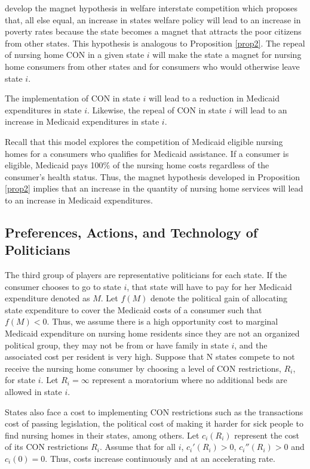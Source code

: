 \documentclass[../Main.tex]{subfiles}
\begin{document}
\citet{peterson1989american} develop the magnet hypothesis in welfare interstate competition which proposes that, all else equal, an increase in states welfare policy will lead to an increase in poverty rates because the state becomes a magnet that attracts the poor citizens from other states. This hypothesis is analogous to Proposition \ref{prop2}. The repeal of nursing home CON in a given state $i$ will make the state a magnet for nursing home consumers from other states and for consumers who would otherwise leave state $i$.

\begin{Proposition} \label{prop3}
The implementation of CON in state $i$ will lead to a reduction in Medicaid expenditures in state $i$. Likewise, the repeal of CON in state $i$ will lead to an increase in Medicaid expenditures in state $i$.  
\end{Proposition}

Recall that this model explores the competition of Medicaid eligible nursing homes for a consumers who qualifies for Medicaid assistance. If a consumer is eligible, Medicaid pays 100\% of the nursing home costs regardless of the consumer's health status. Thus, the magnet hypothesis developed in Proposition \ref{prop2} implies that an increase in the quantity of nursing home services will lead to an increase in Medicaid expenditures.

\subsection{Preferences, Actions, and Technology of Politicians}

The third group of players are representative politicians for each state. If the consumer chooses to go to state $i$, that state will have to pay for her Medicaid expenditure denoted as $M$. Let $f(M)$ denote the political gain of allocating state expenditure to cover the Medicaid costs of a consumer such that $f(M)<0$. Thus, we assume there is a high opportunity cost to marginal Medicaid expenditure on nursing home residents since they are not an organized political group, they may not be from or have family in state $i$, and the associated cost per resident is very high. Suppose that N states compete to not receive the nursing home consumer by choosing a level of CON restrictions, $R_i$, for state $i$. Let $R_i= \infty$ represent a moratorium where no additional beds are allowed in state $i$. 

States also face a cost to implementing CON restrictions such as the transactions cost of passing legislation, the political cost of making it harder for sick people to find nursing homes in their states, among others. Let $c_i(R_i)$ represent the cost of its CON restrictions $R_i$. Assume that for all $i$, $c_i'(R_i)>0$, $c_i''(R_i)>0$ and $c_i(0)=0$. Thus, costs increase continuously and at an accelerating rate.
\end{document}
